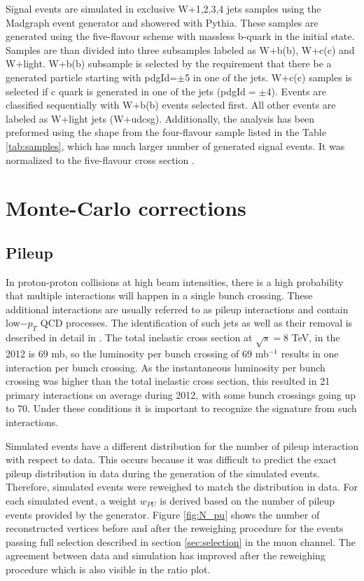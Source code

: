 Signal events are simulated in exclusive W+1,2,3,4 jets samples using the Madgraph event generator and showered with Pythia. These samples are generated using the five-flavour scheme with massless b-quark in the initial state. Samples are than divided into three subsamples labeled as W+b(b), W+c(c) and W+light. W+b(b) subsample is selected by the requirement that there be a generated particle starting with pdgId=$\pm$5 in one of the jets. W+c(c) samples is selected if c quark is generated in one of the jets (pdgId$=\pm$4). Events are classified sequentially with W+b(b) events selected first. All other events are labeled as W+light jets (W+udcsg). Additionally, the analysis has been preformed using the shape from the four-flavour sample listed in the Table \ref{tab:samples}, which has much larger number of generated signal events. It was normalized to the five-flavour cross section .



\section{Monte-Carlo corrections}
\label{sec:mcSF}

\subsection{Pileup}

In proton-proton collisions at high beam intensities, there is a high probability that multiple interactions will happen in a single bunch crossing. These additional interactions are usually referred to as pileup interactions and contain low$-p_T$ QCD processes. The identification of such jets as well as their removal is described in detail in \cite{CMS:2013wea}. The total inelastic cross section at $\sqrt{s}=$8 TeV, in the 2012 is 69 mb, so the luminosity per bunch crossing of 69 mb$^{-1}$ results in one interaction per bunch crossing. As the instantaneous luminosity per bunch crossing was higher than the total inelastic cross section, this resulted in 21 primary interactions on average during 2012, with some bunch crossings  going up to 70. Under these conditions it is important to recognize the signature from such interactions.  
\par Simulated events have a different distribution for the number of pileup interaction with respect to data. This occurs because it was difficult to predict the exact pileup distribution in data during the generation of the simulated events. Therefore, simulated events were reweighed to match the distribution in data. For each simulated event, a weight $w_{PU}$ is derived based on the number of pileup events provided by the generator. Figure \ref{fig:N_pu} shows the number of reconstructed vertices before and after the reweighing procedure for the events passing full selection described in section \ref{sec:selection} in the muon channel. The agreement between data and simulation has improved after the reweighing procedure which is also visible in the ratio plot. 

